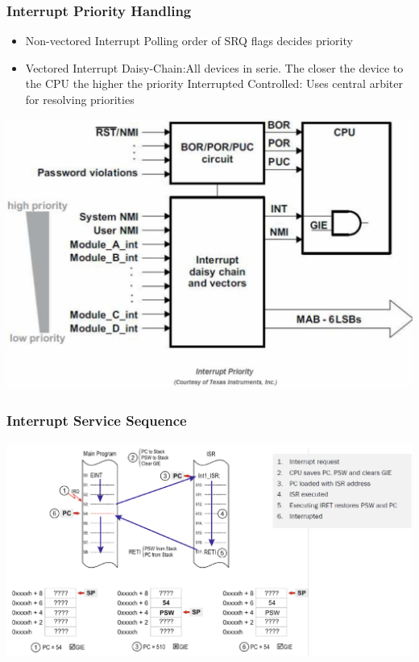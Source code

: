 \begin{minipage}{0.6\linewidth}
    \subsubsection{Interrupt Priority Handling }
    \begin{itemize}
    	\item Non-vectored Interrupt
    	\subitem Polling order of SRQ flags decides priority
    	\item Vectored Interrupt
    	\subitem Daisy-Chain:All devices in serie. The closer the device to the CPU the higher the priority
    	\subitem Interrupted Controlled: Uses central arbiter for resolving priorities
    \end{itemize}
\end{minipage}
\begin{minipage}{0.5\linewidth}
    \includegraphics[width=0.9\linewidth]{images/ISRPrio}
\end{minipage}
\clearpage
\pagebreak
\subsubsection{Interrupt Service Sequence }
\includegraphics[width=16cm]{images/iss.png}

